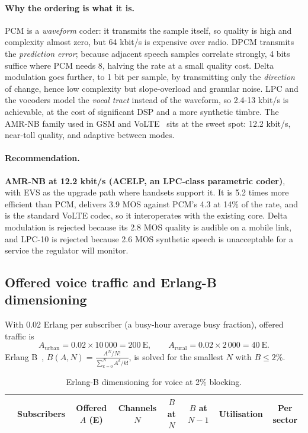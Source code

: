 \documentclass[9pt,a4paper]{article}
\newcommand{\key}[1]{\textbf{#1}}
\begin{document}
\paragraph{Why the ordering is what it is.} PCM is a \emph{waveform} coder: it transmits the sample
itself, so quality is high and complexity almost zero, but 64 kbit/s is expensive over radio.
DPCM transmits the \emph{prediction error}; because adjacent speech samples correlate strongly,
4 bits suffice where PCM needs 8, halving the rate at a small quality cost. Delta modulation goes
further, to 1 bit per sample, by transmitting only the \emph{direction} of change, hence low
complexity but slope-overload and granular noise. LPC and the vocoders model the \emph{vocal
tract} instead of the waveform, so 2.4-13 kbit/s is achievable, at the cost of significant DSP
and a more synthetic timbre. The AMR-NB family used in GSM and VoLTE~\cite{amr,ts26071} sits at the sweet spot:
12.2 kbit/s, near-toll quality, and adaptive between modes.

\paragraph{Recommendation.} \key{AMR-NB at 12.2 kbit/s (ACELP, an LPC-class parametric coder)},
with EVS as the upgrade path where handsets support it. It is 5.2 times more efficient than PCM,
delivers 3.9 MOS against PCM's 4.3 at 14\% of the rate, and is the standard VoLTE codec, so it
interoperates with the existing core. Delta modulation is rejected because its 2.8 MOS quality is
audible on a mobile link, and LPC-10 is rejected because 2.6 MOS synthetic speech is unacceptable
for a service the regulator will monitor.

\subsection{Offered voice traffic and Erlang-B dimensioning}
With 0.02 Erlang per subscriber (a busy-hour average busy fraction), offered traffic is
\[
A_{\text{urban}} = 0.02\times10\,000 = 200\ \text{E},\qquad
A_{\text{rural}} = 0.02\times2\,000 = 40\ \text{E}.
\]
Erlang B~\cite{erlang}, $B(A,N)=\frac{A^N/N!}{\sum_{k=0}^{N}A^k/k!}$, is solved for the smallest $N$ with
$B\leq2\%$.

\begin{table}[H]\centering\small
\caption{Erlang-B dimensioning for voice at 2\% blocking.}
\label{tab:voice}
\begin{tabular}{@{}lccccccc@{}}
\toprule
& Subscribers & Offered $A$ (E) & Channels $N$ & $B$ at $N$ & $B$ at $N{-}1$ & Utilisation & Per sector \\
\midrule
\bottomrule
\end{tabular}
\end{table}
\end{document}
